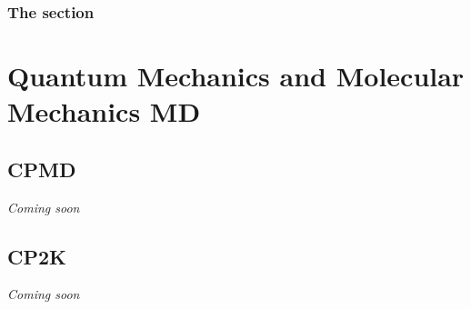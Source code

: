 \subsubsection*{The  section}

\section{Quantum Mechanics and Molecular Mechanics MD}

\subsection{CPMD}

{\em{Coming soon}}

\subsection{CP2K}

{\em{Coming soon}}

